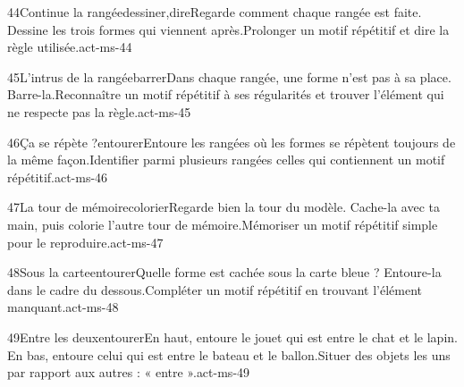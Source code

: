 \begin{activite}{44}{Continue la rangée}{dessiner,dire}{Regarde comment chaque rangée est faite. {\otBold\color{otNavy}Dessine} les trois formes qui viennent après.}{Prolonger un motif répétitif et dire la règle utilisée.}{act-ms-44}
\end{activite}
\begin{activite}{45}{L’intrus de la rangée}{barrer}{Dans chaque rangée, une forme n’est pas à sa place. {\otBold\color{otNavy}Barre-la}.}{Reconnaître un motif répétitif à ses régularités et trouver l’élément qui ne respecte pas la règle.}{act-ms-45}
\end{activite}
\begin{activite}{46}{Ça se répète ?}{entourer}{Entoure les rangées où les formes {\otBold\color{otNavy}se répètent} toujours de la même façon.}{Identifier parmi plusieurs rangées celles qui contiennent un motif répétitif.}{act-ms-46}
\end{activite}
\begin{activite}{47}{La tour de mémoire}{colorier}{Regarde bien la tour du modèle. {\otBold\color{otNavy}Cache-la} avec ta main, puis colorie l’autre tour de mémoire.}{Mémoriser un motif répétitif simple pour le reproduire.}{act-ms-47}
\end{activite}
\begin{activite}{48}{Sous la carte}{entourer}{Quelle forme est cachée sous la carte bleue ? {\otBold\color{otNavy}Entoure-la} dans le cadre du dessous.}{Compléter un motif répétitif en trouvant l’élément manquant.}{act-ms-48}
\end{activite}
\begin{activite}{49}{Entre les deux}{entourer}{En haut, entoure le jouet qui est {\otBold\color{otNavy}entre} le chat et le lapin. En bas, entoure celui qui est entre le bateau et le ballon.}{Situer des objets les uns par rapport aux autres : « entre ».}{act-ms-49}
\end{activite}
